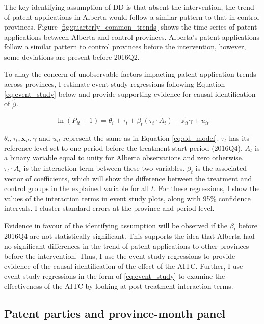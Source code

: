 \documentclass[../main.tex]{subfiles}
\begin{document}
The key identifying assumption of DD is that absent the intervention, the trend of patent applications in Alberta would follow a similar pattern to that in control provinces. Figure \ref{fig:quarterly_common_trends} shows the time series of patent applications between Alberta and control provinces. Alberta's patent applications follow a similar pattern to control provinces before the intervention, however, some deviations are present before 2016Q2.

To allay the concern of unobservable factors impacting patent application trends across provinces, I estimate event study regressions following Equation \ref{eq:event_study} below and provide supporting evidence for causal identification of $\hat{\beta}$.

\begin{equation}
    \label{eq:event_study}
   \ln(P_{it} + 1) = \theta_i + \tau_t + \beta_t (\tau_t \cdot A_t) + \mathbb{x}_{it}^{'}\gamma + u_{it}
\end{equation}

$\theta_i, \tau_t, \mathbf{x}_{it}, \gamma$ and $u_{it}$ represent the same as in Equation \ref{eq:dd_model}. $\tau_t$ has its reference level set to one period before the treatment start period (2016Q4). $A_t$ is a binary variable equal to unity for Alberta observations and zero otherwise. $\tau_t \cdot A_t$ is the interaction term between these two variables. $\beta_t$ is the associated vector of coefficients, which will show the difference between the treatment and control groups in the explained variable for all $t$. For these regressions, I show the values of the interaction terms in event study plots, along with 95\% confidence intervals. I cluster standard errors at the province and period level.

Evidence in favour of the identifying assumption will be observed if the $\beta_t$ before 2016Q4 are not statistically significant. This supports the idea that Alberta had no significant differences in the trend of patent applications to other provinces before the intervention. Thus, I use the event study regressions to provide evidence of the causal identification of the effect of the AITC. Further, I use event study regressions in the form of \ref{eq:event_study} to examine the effectiveness of the AITC by looking at post-treatment interaction terms.

\subsection{Patent parties and province-month panel}
\end{document}
